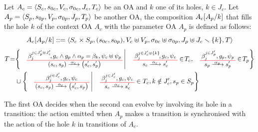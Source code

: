 \documentclass[runningheads]{llncs}
\begin{document}
\begin{definition}[Composition of OA] \label{Def:CompOA}
Let  \(A_c = \OAg[c]\) be an OA and $k$ one of its holes, \(k \in J_c\). Let \(A_p = \OAg[p]\) be another OA,  the composition $A_c\subst{A_p}{k}$ that fills the hole $k$ of the context OA \(A_c\) with the parameter OA \(A_p\) is defined as follows:
\[A_c\subst{A_p}{k} ::=  \OA{S_c \times S_p}{\mpar{s_{0c}, s_{0p}}}{V_c \uplus V_p}{\sigma_{0c} \uplus \sigma_{0p}}{J_p \uplus J_c \setminus \mbrc{k}}{T} \] 
\begin{align*}
T\!=& \mset{\OT{\mpar{s_c, s_p}}{\mpar{s'_c, s'_p}}{\alpha_c}{\beta_j^{j \in J'_p \uplus J'_c}\!}{g_c \wedge g_p \wedge \alpha_p = \beta_k}{\psi_c \uplus \psi_p}}{ \OT{s_c}{s'_c}{\alpha_c}{\beta_j^{j \in J'_c \uplus \mbrc{k} }\!}{g_c}{\psi_c} \in\! T_c, \OTx{p}{}{}{p} \in\! T_p} \\
	& \cup \mset{\OT{\mpar{s_c, s_p}}{\mpar{s'_c, s_p}}{\alpha_c}{\beta_j^{j \in J'_c}}{g_c}{\psi_c}}{\OTx{c}{}{}{c} \in T_c, k \notin J'_c, s_p \in S_p}
\end{align*}
\end{definition}

The first OA decides when the second can evolve by involving its hole in a transition: the action emitted when \(A_p\) makes a transition is synchronised with the action of the hole \(k\) in transitions of \(A_c\).
\end{document}
